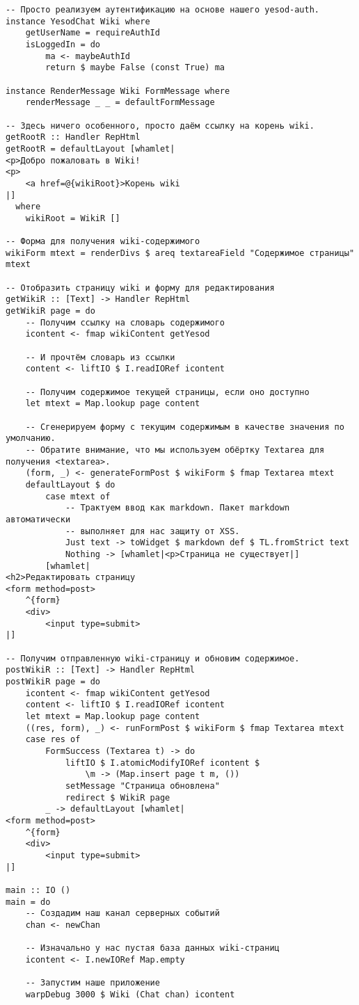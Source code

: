 \begin{lstlisting}
-- Просто реализуем аутентификацию на основе нашего yesod-auth.
instance YesodChat Wiki where
    getUserName = requireAuthId
    isLoggedIn = do
        ma <- maybeAuthId
        return $ maybe False (const True) ma

instance RenderMessage Wiki FormMessage where
    renderMessage _ _ = defaultFormMessage

-- Здесь ничего особенного, просто даём ссылку на корень wiki.
getRootR :: Handler RepHtml
getRootR = defaultLayout [whamlet|
<p>Добро пожаловать в Wiki!
<p>
    <a href=@{wikiRoot}>Корень wiki
|]
  where
    wikiRoot = WikiR []

-- Форма для получения wiki-содержимого
wikiForm mtext = renderDivs $ areq textareaField "Содержимое страницы" mtext

-- Отобразить страницу wiki и форму для редактирования
getWikiR :: [Text] -> Handler RepHtml
getWikiR page = do
    -- Получим ссылку на словарь содержимого
    icontent <- fmap wikiContent getYesod

    -- И прочтём словарь из ссылки
    content <- liftIO $ I.readIORef icontent

    -- Получим содержимое текущей страницы, если оно доступно
    let mtext = Map.lookup page content

    -- Сгенерируем форму с текущим содержимым в качестве значения по умолчанию.
    -- Обратите внимание, что мы используем обёртку Textarea для получения <textarea>.
    (form, _) <- generateFormPost $ wikiForm $ fmap Textarea mtext
    defaultLayout $ do
        case mtext of
            -- Трактуем ввод как markdown. Пакет markdown автоматически
            -- выполняет для нас защиту от XSS.
            Just text -> toWidget $ markdown def $ TL.fromStrict text
            Nothing -> [whamlet|<p>Страница не существует|]
        [whamlet|
<h2>Редактировать страницу
<form method=post>
    ^{form}
    <div>
        <input type=submit>
|]

-- Получим отправленную wiki-страницу и обновим содержимое.
postWikiR :: [Text] -> Handler RepHtml
postWikiR page = do
    icontent <- fmap wikiContent getYesod
    content <- liftIO $ I.readIORef icontent
    let mtext = Map.lookup page content
    ((res, form), _) <- runFormPost $ wikiForm $ fmap Textarea mtext
    case res of
        FormSuccess (Textarea t) -> do
            liftIO $ I.atomicModifyIORef icontent $
                \m -> (Map.insert page t m, ())
            setMessage "Страница обновлена"
            redirect $ WikiR page
        _ -> defaultLayout [whamlet|
<form method=post>
    ^{form}
    <div>
        <input type=submit>
|]

main :: IO ()
main = do
    -- Создадим наш канал серверных событий
    chan <- newChan

    -- Изначально у нас пустая база данных wiki-страниц
    icontent <- I.newIORef Map.empty

    -- Запустим наше приложение
    warpDebug 3000 $ Wiki (Chat chan) icontent
\end{lstlisting}

